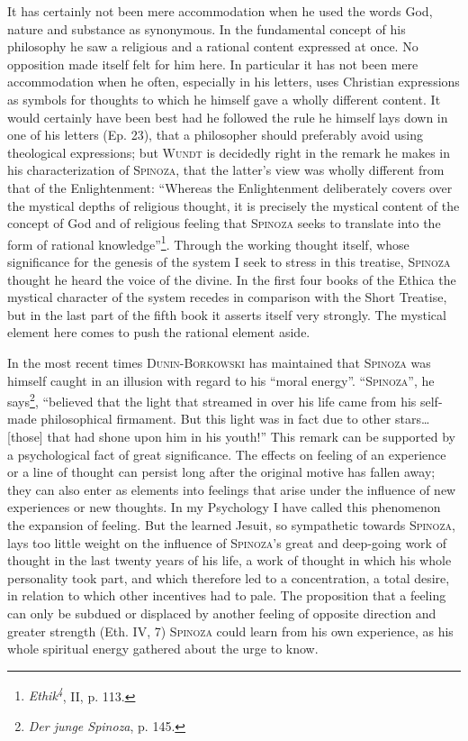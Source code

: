 \documentclass[12pt]{article}
\newcommand{\opage}[1]{\marginnote{\footnotesize\textit{[#1]}}}
\begin{document}
It has certainly not been mere accommodation when he used the words God, nature and
substance as synonymous. In the fundamental concept of his philosophy he saw a
religious and a rational content expressed at once. No opposition made itself felt
for him here. In particular it has not been mere accommodation when he often,
especially in his letters, uses Christian expressions as symbols for thoughts to
which he himself gave a wholly different content. It would certainly have been best
had he followed the rule he himself lays down in one of his letters (Ep. 23), that a
philosopher should preferably avoid using theological expressions; but
\textsc{Wundt} is decidedly right in the remark he makes in his characterization of
\textsc{Spinoza}, that the latter's view was wholly different from that of the
Enlightenment: ``Whereas the Enlightenment deliberately covers over the mystical
depths of religious thought, it is precisely the mystical content of the concept of
God and of religious feeling that \textsc{Spinoza} seeks to translate into the form
of rational knowledge''\footnote{\textit{Ethik\textsuperscript{4}}, II, p. 113.}.
Through the working thought itself, whose \opage{13}significance for the genesis of
the system I seek to stress in this treatise, \textsc{Spinoza} thought he heard the
voice of the divine. In the first four books of the Ethica the mystical character of
the system recedes in comparison with the Short Treatise, but in the last part of
the fifth book it asserts itself very strongly. The mystical element here comes to
push the rational element aside.

In the most recent times \textsc{Dunin-Borkowski} has maintained that
\textsc{Spinoza} was himself caught in an illusion with regard to his ``moral
energy''. ``\textsc{Spinoza}'', he says\footnote{\textit{Der junge Spinoza}, p.
145.}, ``believed that the light that streamed in over his life came from his
self-made philosophical firmament. But this light was in fact due to other
stars\dots{} [those] that had shone upon him in his youth!'' This remark can be
supported by a psychological fact of great significance. The effects on feeling of
an experience or a line of thought can persist long after the original motive has
fallen away; they can also enter as elements into feelings that arise under the
influence of new experiences or new thoughts. In my Psychology I have called this
phenomenon the expansion of feeling. But the learned Jesuit, so sympathetic towards
\textsc{Spinoza}, lays too little weight on the influence of \textsc{Spinoza}'s great
and deep-going work of thought in the last twenty years of his life, a work of
thought in which his whole personality took part, and which therefore led to a
concentration, a total desire, in relation to which other incentives had to pale.
The proposition that a feeling can only be subdued or displaced by another feeling of
opposite direction and greater strength (Eth. IV, 7) \textsc{Spinoza} could learn
from his own experience, as his whole spiritual energy gathered about the urge to
know.
\end{document}

